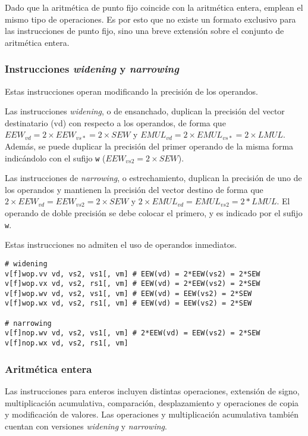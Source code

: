 Dado que la aritmética de punto fijo coincide con la aritmética entera, emplean
el mismo tipo de operaciones. Es por esto que no existe un formato exclusivo
para las instrucciones de punto fijo, sino una breve extensión sobre el
conjunto de aritmética entera.

\subsubsection{Instrucciones \textit{widening} y \textit{narrowing}}
Estas instrucciones operan modificando la precisión de los operandos.

Las instrucciones \textit{widening}, o de ensanchado, duplican la precisión del
vector destinatario (vd) con respecto a los operandos, de forma
que $EEW_{vd} = 2\times EEW_{vs*} = 2\times SEW$ y $EMUL_{vd} = 2\times
EMUL_{vs*} = 2\times LMUL$. Además, se puede duplicar la precisión del primer
operando de la misma forma indicándolo con el sufijo \texttt{w} ($EEW_{vs2} = 2\times SEW$).

Las instrucciones de \textit{narrowing}, o estrechamiento, duplican la
precisión de uno de los operandos y mantienen la precisión del vector destino
de forma que $2\times EEW_{vd} = EEW_{vs2} = 2\times SEW$ y $2\times
EMUL_{vd} = EMUL_{vs2} = 2*LMUL$. El operando de doble precisión se debe
colocar el primero, y es indicado por el sufijo \texttt{w}. 

Estas instrucciones no admiten el uso de operandos inmediatos.

\begin{lstlisting}
# widening
v[f]wop.vv vd, vs2, vs1[, vm] # EEW(vd) = 2*EEW(vs2) = 2*SEW
v[f]wop.vx vd, vs2, rs1[, vm] # EEW(vd) = 2*EEW(vs2) = 2*SEW
v[f]wop.wv vd, vs2, vs1[, vm] # EEW(vd) = EEW(vs2) = 2*SEW
v[f]wop.wx vd, vs2, rs1[, vm] # EEW(vd) = EEW(vs2) = 2*SEW
                       
# narrowing            
v[f]nop.wv vd, vs2, vs1[, vm] # 2*EEW(vd) = EEW(vs2) = 2*SEW
v[f]nop.wx vd, vs2, rs1[, vm]
\end{lstlisting}

\subsubsection{Aritmética entera}{\label{sec:int-operations}}

Las instrucciones para enteros incluyen distintas operaciones, extensión de
signo, multiplicación acumulativa, comparación, desplazamiento y operaciones de copia y
modificación de valores. Las operaciones y multiplicación acumulativa también
cuentan con versiones \textit{widening} y \textit{narrowing}.

